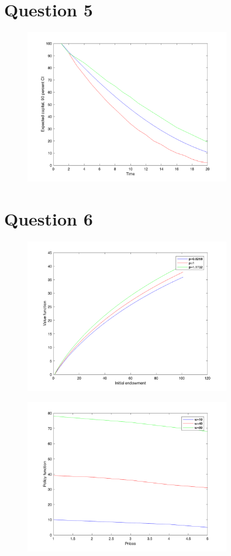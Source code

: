 \documentclass[a4paper, fontsize=12pt]{article}
\begin{document}
 \section{Question 5}
 \begin{figure}[H]
     \centering
     \includegraphics[width=9cm]{3.png}
 \end{figure}
 \section{Question 6}
 \begin{figure}[H]
     \centering
     \includegraphics[width=9cm]{4.png}
 \end{figure}
  \begin{figure}[H]
     \centering
     \includegraphics[width=9cm]{5.png}
 \end{figure}
\end{document}
